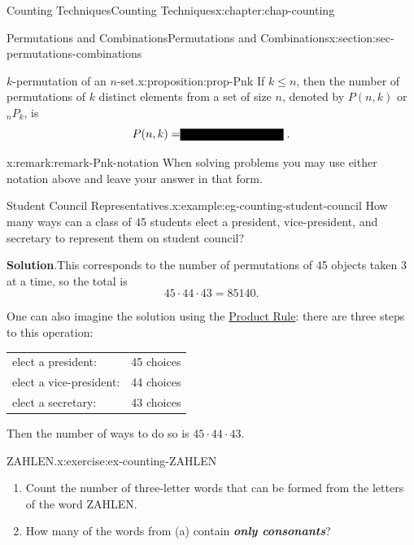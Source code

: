 \documentclass[oneside,10pt,]{book}
\newcommand{\blocktitlefont}{\relax}
\newcommand{\tabularfont}{\relax}
\newcommand{\alert}[1]{\textbf{\textit{#1}}}
\newcommand{\fillin}[1]{\leavevmode\leaders\vrule height -1.2pt depth 1.5pt \hskip #1em minus #1em \null}
\numberwithin{equation}{section}
\begin{document}
\begin{chapterptx}{Counting Techniques}{}{Counting Techniques}{}{}{x:chapter:chap-counting}
\begin{sectionptx}{Permutations and Combinations}{}{Permutations and Combinations}{}{}{x:section:sec-permutations-combinations}
\begin{proposition}{\(k\)-permutation of an \(n\)-set.}{}{x:proposition:prop-Pnk}
\label{g:notation:id471354} If \(k \leq n\), then the number of permutations of \(k\) distinct elements from a set of size \(n\), denoted by \(P(n,k)\) or \({}_nP_k\), is%
\begin{equation*}
P(n,k) = \fillin{9.090909090909092}\text{.}
\end{equation*}
%
\end{proposition}
\begin{remark}{}{x:remark:remark-Pnk-notation}%
When solving problems you may use either notation above and leave your answer in that form.%
\end{remark}
\begin{example}{Student Council Representatives.}{x:example:eg-counting-student-council}%
How many ways can a class of 45 students elect a president, vice-president, and secretary to represent them on student council?%
\par\smallskip%
\noindent\textbf{\blocktitlefont Solution}.\hypertarget{g:solution:id471446}{}\quad{}This corresponds to the number of permutations of 45 objects taken 3 at a time, so the total is%
\begin{equation*}
45 \cdot 44 \cdot 43 = 85140\text{.}
\end{equation*}
%
\par
One can also imagine the solution using the \hyperref[x:principle:prin-prod-rule]{Product Rule}: there are three steps to this operation:%
\begin{sidebyside}{1}{0.15}{0.15}{0}%
\begin{sbspanel}{0.7}%
{\centering%
{\tabularfont%
\begin{tabular}{ll}
elect a president:&45 choices\tabularnewline[0pt]
elect a vice-president:&44 choices\tabularnewline[0pt]
elect a secretary:&43 choices
\end{tabular}
}%
\par}
\end{sbspanel}%
\end{sidebyside}%
\par
Then the number of ways to do so is \(45 \cdot 44 \cdot 43\).%
\end{example}
\begin{inlineexercise}{ZAHLEN.}{x:exercise:ex-counting-ZAHLEN}%
%
\begin{enumerate}[label=(\alph*)]
\item{}Count the number of three-letter words that can be formed from the letters of the word ZAHLEN.%
\item{}How many of the words from (a) contain \alert{only consonants}?%

\end{enumerate}
\end{inlineexercise}
\end{sectionptx}
\end{chapterptx}
\end{document}
